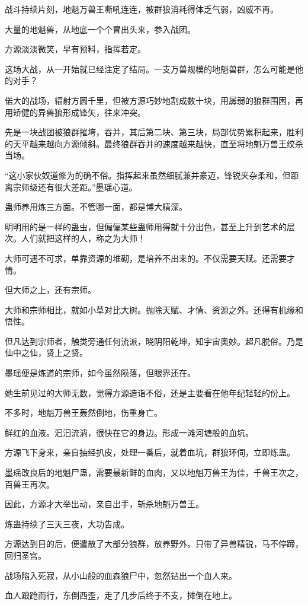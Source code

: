 \begin{this_body}
战斗持续片刻，地魁万兽王嘶吼连连，被群狼消耗得体乏气弱，凶威不再。

大量的地魁兽，从地底一个个冒出头来，参入战团。

方源淡淡微笑，早有预料，指挥若定。

这场大战，从一开始就已经注定了结局。一支万兽规模的地魁兽群，怎么可能是他的对手？

偌大的战场，辐射方圆千里，但被方源巧妙地割成数十块，用孱弱的狼群围困，再用矫健的异兽狼形成锋矢，往来冲突。

先是一块战团被狼群摧垮，吞并，其后第二块、第三块，局部优势累积起来，胜利的天平越来越向方源倾斜。最终狼群吞并的速度越来越快，直至将地魁万兽王绞杀当场。

“这小家伙奴道修为的确不俗。指挥起来虽然细腻兼并豪迈，锋锐夹杂柔和，但距离宗师级还有很大差距。”墨瑶心道。

蛊师养用炼三方面。不管哪一面，都是博大精深。

明明用的是一样的蛊虫，但偏偏某些蛊师用得就十分出色，甚至上升到艺术的层次。人们就把这样的人，称之为大师！

大师可遇不可求，单靠资源的堆砌，是培养不出来的。不仅需要天赋。还需要才情。

但大师之上，还有宗师。

大师和宗师相比，就如小草对比大树。抛除天赋、才情、资源之外。还得有机缘和悟性。

但凡达到宗师者，触类旁通任何流派，晓阴阳乾坤，知宇宙奥妙。超凡脱俗。乃是仙中之仙，贤上之贤。

墨瑶便是炼道的宗师，如今虽然陨落，但眼界还在。

她生前见过的大师无数，觉得方源造诣不俗，还是主要看在他年纪轻轻的份上。

不多时，地魁万兽王轰然倒地，伤重身亡。

鲜红的血液。汩汩流淌，很快在它的身边。形成一滩河塘般的血坑。

方源飞下身来，亲自抽经扒皮，处理一番后，就着血坑，群狼环伺，立即炼蛊。

墨瑶改良后的地魁尸蛊，需要最新鲜的血肉，又以地魁万兽王为佳，千兽王次之，百兽王再次。

因此，方源才大举出动，亲自出手，斩杀地魁万兽王。

炼蛊持续了三天三夜，大功告成。

方源达到目的后，便遣散了大部分狼群，放养野外。只带了异兽精锐，马不停蹄，回归圣宫。

战场陷入死寂，从小山般的血森狼尸中，忽然钻出一个血人来。

血人踉跄而行，东倒西歪，走了几步后终于不支，摊倒在地上。


\end{this_body}

